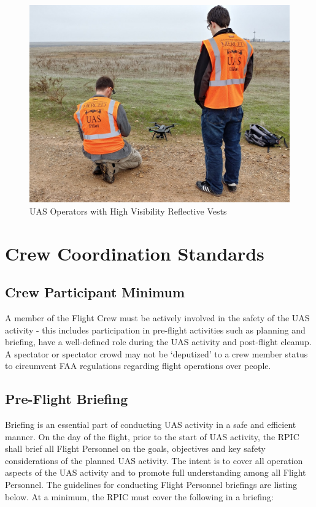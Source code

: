 \documentclass[
]{book}
\begin{document}
\begin{figure}

{\centering \includegraphics[width=0.6\linewidth]{images/UAS_Vest} 

}

\caption{UAS Operators with High Visibility Reflective Vests}\label{fig:UASvests}
\end{figure}

\chapter{Crew Coordination Standards}\label{ch-crm}

\section{Crew Participant Minimum}\label{crew-participant-minimum}

A member of the Flight Crew must be actively involved in the safety of the UAS activity - this includes participation in pre-flight activities such as planning and briefing, have a well-defined role during the UAS activity and post-flight cleanup. A spectator or spectator crowd may not be `deputized' to a crew member status to circumvent FAA regulations regarding flight operations over people.

\section{Pre-Flight Briefing}\label{pfb}

Briefing is an essential part of conducting UAS activity in a safe and efficient manner. On the day of the flight, prior to the start of UAS activity, the RPIC shall brief all Flight Personnel on the goals, objectives and key safety considerations of the planned UAS activity. The intent is to cover all operation aspects of the UAS activity and to promote full understanding among all Flight Personnel. The guidelines for conducting Flight Personnel briefings are listing below. At a minimum, the RPIC must cover the following in a briefing:
\end{document}

